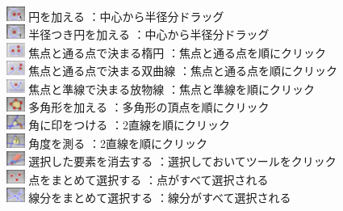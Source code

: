 \documentclass[papersize,a4paper,12pt,uplatex]{jsarticle}
\begin{document}
\begin{tabbing}
\includegraphics[bb=0 0 6.48 5.04 , width=0.6cm]{Fig/multi-add-circle.pdf}    円を加える   \>：中心から半径分ドラッグ\\
\includegraphics[bb=0 0 6.48 5.04 , width=0.6cm]{Fig/circle-by-radius.pdf}    半径つき円を加える   \>：中心から半径分ドラッグ\\
\includegraphics[bb=0 0 6.48 5.04 , width=0.6cm]{Fig/ellipse-by-foci.pdf}    焦点と通る点で決まる楕円 \>：焦点と通る点を順にクリック\\
\includegraphics[bb=0 0 6.48 5.04 , width=0.6cm]{Fig/hyperbola-by-foci.pdf}    焦点と通る点で決まる双曲線 \>：焦点と通る点を順にクリック\\
\includegraphics[bb=0 0 6.48 5.04 , width=0.6cm]{Fig/parabola-by-foci.pdf}    焦点と準線で決まる放物線 \>：焦点と準線を順にクリック\\
\includegraphics[bb=0 0 6.48 5.04 , width=0.6cm]{Fig/polygon.pdf}    多角形を加える   \>：多角形の頂点を順にクリック\\
\includegraphics[bb=0 0 6.48 5.04 , width=0.6cm]{Fig/angle-mark.pdf}    角に印をつける   \>：2直線を順にクリック\\
\includegraphics[bb=0 0 6.48 5.04 , width=0.6cm]{Fig/angle.pdf}    角度を測る   \>：2直線を順にクリック\\
\includegraphics[bb=0 0 6.48 5.04 , width=0.6cm]{Fig/delete.pdf}    選択した要素を消去する   \>：選択しておいてツールをクリック\\
\includegraphics[bb=0 0 6.48 5.04 , width=0.6cm]{Fig/select-points.pdf}    点をまとめて選択する   \>：点がすべて選択される\\
\includegraphics[bb=0 0 6.48 5.04 , width=0.6cm]{Fig/select-lines.pdf}    線分をまとめて選択する   \>：線分がすべて選択される\\
 \end{tabbing}
\end{document}
